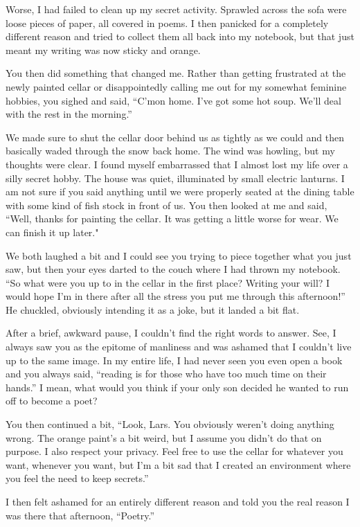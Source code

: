 Worse, I had failed to clean up my secret activity.
Sprawled across the sofa were loose pieces of paper, all covered in poems.
I then panicked for a completely different reason and tried to collect them all back into my notebook, but that just meant my writing was now sticky and orange.

You then did something that changed me.
Rather than getting frustrated at the newly painted cellar or disappointedly calling me out for my somewhat feminine hobbies, you sighed and said, ``C'mon home. I've got some hot soup. We'll deal with the rest in the morning.''

We made sure to shut the cellar door behind us as tightly as we could and then basically waded through the snow back home.
The wind was howling, but my thoughts were clear.
I found myself embarrassed that I almost lost my life over a silly secret hobby.
The house was quiet, illuminated by small electric lanturns.
I am not sure if you said anything until we were properly seated at the dining table with some kind of fish stock in front of us.
You then looked at me and said, ``Well, thanks for painting the cellar. It was getting a little worse for wear. We can finish it up later."

We both laughed a bit and I could see you trying to piece together what you just saw, but then your eyes darted to the couch where I had thrown my notebook.
``So what were you up to in the cellar in the first place? Writing your will? I would hope I'm in there after all the stress you put me through this afternoon!''
He chuckled, obviously intending it as a joke, but it landed a bit flat.

After a brief, awkward pause, I couldn't find the right words to answer.
See, I always saw you as the epitome of manliness and was ashamed that I couldn't live up to the same image.
In my entire life, I had never seen you even open a book and you always said, ``reading is for those who have too much time on their hands.''
I mean, what would you think if your only son decided he wanted to run off to become a poet?

You then continued a bit, ``Look, Lars. You obviously weren't doing anything wrong.
The orange paint's a bit weird, but I assume you didn't do that on purpose.
I also respect your privacy.
Feel free to use the cellar for whatever you want, whenever you want, but I'm a bit sad that I created an environment where you feel the need to keep secrets.''

I then felt ashamed for an entirely different reason and told you the real reason I was there that afternoon, ``Poetry.''

